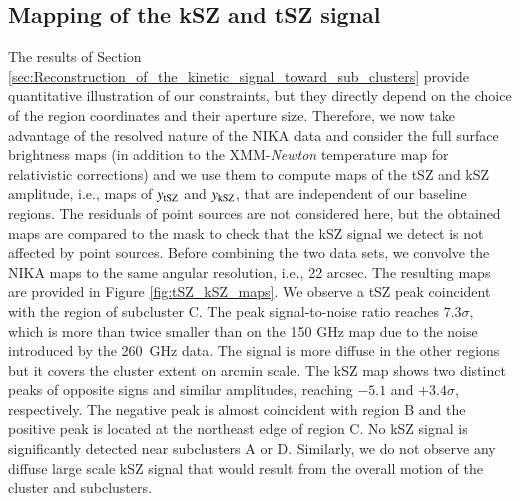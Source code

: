\documentclass[twocolumn,traditabstract]{aa}
\begin{document}
\subsection{Mapping of the kSZ and tSZ signal}
The results of Section \ref{sec:Reconstruction_of_the_kinetic_signal_toward_sub_clusters} provide quantitative illustration of our constraints, but they directly depend on the choice of the region coordinates and their aperture size. Therefore, we now take advantage of the resolved nature of the NIKA data and consider the full surface brightness maps (in addition to the XMM-\textit{Newton} temperature map for relativistic corrections) and we use them to compute maps of the tSZ and kSZ amplitude, i.e., maps of $y_{\rm tSZ}$ and $y_{\rm kSZ}$, that are independent of our baseline regions. The residuals of point sources are not considered here, but the obtained maps are compared to the mask to check that the kSZ signal we detect is not affected by point sources. Before combining the two data sets, we convolve the NIKA maps to the same angular resolution, i.e., 22 arcsec. The resulting maps are provided in Figure  \ref{fig:tSZ_kSZ_maps}. We observe a tSZ peak coincident with the region of subcluster C. The peak signal-to-noise ratio reaches $7.3 \sigma$, which is more than twice smaller than on the 150 GHz map due to the noise introduced by the 260~GHz data. The signal is more diffuse in the other regions but it covers the cluster extent on arcmin scale. The kSZ map shows two distinct peaks of opposite signs and similar amplitudes, reaching $-5.1$ and $+3.4 \sigma$, respectively. The negative peak is almost coincident with region B and the positive peak is located at the northeast edge of region C. No kSZ signal is significantly detected near subclusters A or D. Similarly, we do not observe any diffuse large scale kSZ signal that would result from the overall motion of the cluster and subclusters.
\end{document}
